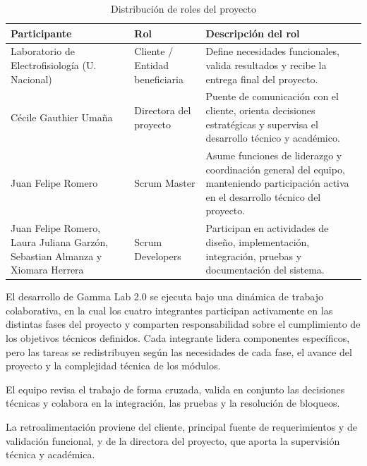 \documentclass{article}
\begin{document}
\begin{table}[H]
\renewcommand{\arraystretch}{1.3}

\begin{tabular}{|p{3.5cm}|p{3.5cm}|p{4.5cm}|}
\hline
\textbf{Participante} & \textbf{Rol} & \textbf{Descripción del rol} \\ \hline

Laboratorio de Electrofisiología (U. Nacional) & Cliente / Entidad beneficiaria & Define necesidades funcionales, valida resultados y recibe la entrega final del proyecto. \\ \hline

Cécile Gauthier Umaña & Directora del proyecto & Puente de comunicación con el cliente, orienta decisiones estratégicas y supervisa el desarrollo técnico y académico. \\ \hline

Juan Felipe Romero & Scrum Master & Asume funciones de liderazgo y coordinación general del equipo, manteniendo participación activa en el desarrollo técnico del proyecto. \\ \hline

Juan Felipe Romero, Laura Juliana Garzón, Sebastian Almanza y Xiomara Herrera & Scrum Developers & Participan en actividades de diseño, implementación, integración, pruebas y documentación del sistema. \\ \hline

\end{tabular}
\centering
\caption{Distribución de roles del proyecto}
\label{tab:roles_equipo}
\end{table}

El desarrollo de Gamma Lab 2.0 se ejecuta bajo una dinámica de trabajo colaborativa, en la cual los cuatro integrantes participan activamente en las distintas fases del proyecto y comparten responsabilidad sobre el cumplimiento de los objetivos técnicos definidos. Cada integrante lidera componentes específicos, pero las tareas se redistribuyen según las necesidades de cada fase, el avance del proyecto y la complejidad técnica de los módulos.

El equipo revisa el trabajo de forma cruzada, valida en conjunto las decisiones técnicas y colabora en la integración, las pruebas y la resolución de bloqueos.

La retroalimentación proviene del cliente, principal fuente de requerimientos y de validación funcional, y de la directora del proyecto, que aporta la supervisión técnica y académica.
\end{document}

